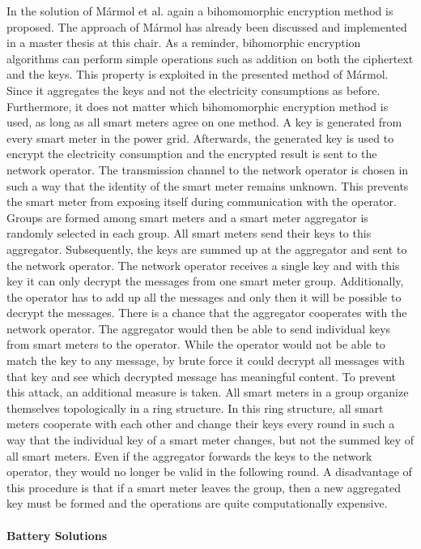 In the solution of Mármol et al. \cite{marmol2012not} again a bihomomorphic encryption method is proposed. The approach of Mármol has already been discussed and implemented in a master thesis at this chair\cite{Anna}. As a reminder, bihomorphic encryption algorithms can perform simple operations such as addition on both the ciphertext and the keys. This property is exploited in the presented method of Mármol. Since it aggregates the keys and not the electricity consumptions as before. Furthermore, it does not matter which bihomomorphic encryption method is used, as long as all smart meters agree on one method. A key is generated from every smart meter in the power grid. Afterwards, the generated key is used to encrypt the electricity consumption and the encrypted result is sent to the network operator. The transmission channel to the network operator is chosen in such a way that the identity of the smart meter remains unknown. This prevents the smart meter from exposing itself during communication with the operator. Groups are formed among smart meters and a smart meter aggregator is randomly selected in each group. All smart meters send their keys to this aggregator. Subsequently, the keys are summed up at the aggregator and sent to the network operator. The network operator receives a single key and with this key it can only decrypt the messages from one smart meter group. Additionally, the operator has to add up all the messages and only then it will be possible to decrypt the messages. There is a chance that the aggregator cooperates with the network operator. The aggregator would then be able to send individual keys from smart meters to the operator. While the operator would not be able to match the key to any message, by brute force it could decrypt all messages with that key and see which decrypted message has meaningful content. To prevent this attack, an additional measure is taken. All smart meters in a group organize themselves topologically in a ring structure. In this ring structure, all smart meters cooperate with each other and change their keys every round in such a way that the individual key of a smart meter changes, but not the summed key of all smart meters. Even if the aggregator forwards the keys to the network operator, they would no longer be valid in the following round. A disadvantage of this procedure is that if a smart meter leaves the group, then a new aggregated key must be formed and the operations are quite computationally expensive.\\
\\
\textbf{Battery Solutions}
